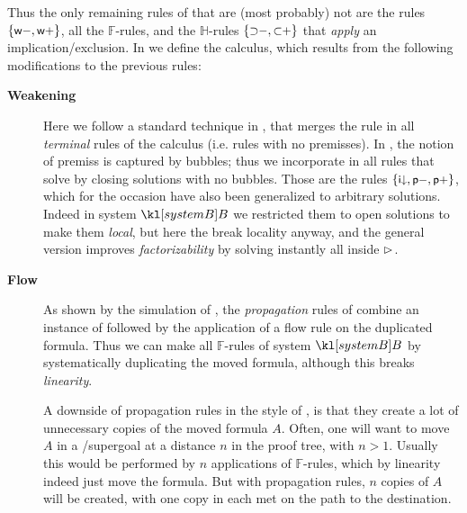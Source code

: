 Thus the only remaining rules of  that are (most probably) not
 are the  rules $\{\text{\small$\mathsf{w{-}}$},\text{\small$\mathsf{w{+}}$}\}$, all the
$\mathbb{F}$-rules, and the $\mathbb{H}$-rules $\{\text{\small$\mathsf{{\supset}{-}}$},
\text{\small$\mathsf{{\subset}{+}}$}\}$ that \emph{apply} an implication/exclusion.
In  we define the  calculus, which results
from the following modifications to the previous rules:
\begin{description}
  \item[\textbf{Weakening}]
    Here we follow a standard technique in , that merges the
     rule in all \emph{terminal} rules of the calculus (i.e. rules with
    no premisses). In , the notion of premiss is captured by
     bubbles; thus we incorporate  in all rules that solve
     by closing solutions with no  bubbles. Those are the rules
    $\{\text{\small$\mathsf{i{\downarrow}}$},\text{\small$\mathsf{p{-}}$},\text{\small$\mathsf{p{+}}$}\}$, which for the occasion have
    also been generalized to arbitrary solutions. Indeed in system $\sysB$ we
    restricted them to open solutions to make them \emph{local}, but here the
     break locality anyway, and the general version improves
    \emph{factorizability} by solving instantly all  inside $\mathbin{\rhd}$.

  \item[\textbf{Flow}]
    As shown by the simulation of , the
    \emph{propagation} rules of  combine an instance of
    \emph{} followed by the application of a flow rule on the
    duplicated formula. Thus we can make all $\mathbb{F}$-rules of system
    $\sysB$  by systematically duplicating the moved formula, although
    this breaks \emph{linearity}.

    A downside of propagation rules in the style of , is that they
    create a lot of unnecessary copies of the moved formula $A$. Often, one will
    want to move $A$ in a /supergoal at a distance $n$ in the proof tree,
    with $n > 1$. Usually this would be performed by $n$ applications of
    $\mathbb{F}$-rules, which by linearity indeed just move the formula. But with
    propagation rules, $n$ copies of $A$ will be created, with one copy in each
     met on the path to the destination.


\end{description}
